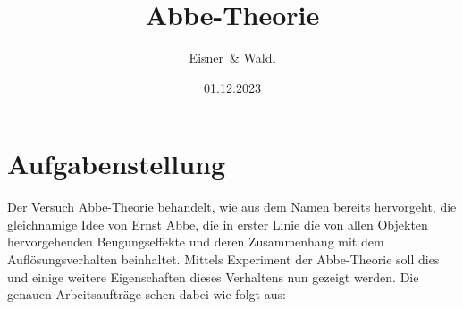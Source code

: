 \documentclass[12pt,a4paper,twoside]{article}
\begin{document}
\newcommand\laboratorynumber{2}
\title{Abbe-Theorie}
\newcommand\supervisor{Robert Nuster}
\newcommand\groupnumber{42}

\newcommand\participantonelastname{Eisner}
\newcommand\participantonefirstname{Nico}
\newcommand\participantoneid{12214121}
\newcommand\participanttwolastname{Waldl}
\newcommand\participanttwofirstname{Philip}
\newcommand\participanttwoid{12214120}
\author{\participantonelastname \ \& \participanttwolastname}

\newcommand\degreeid{UB 033 678}
\newcommand\semester{23WS}
\date{01.12.2023}

\newcommand\coursetitle{Laborübungen 2: \\ Elektrizität, Magnetismus, Optik}

%



\tableofcontents
\newpage

\section{Aufgabenstellung} %

Der Versuch Abbe-Theorie behandelt, wie aus dem Namen bereits hervorgeht, die gleichnamige Idee von Ernst Abbe, die in erster Linie die von allen Objekten hervorgehenden Beugungseffekte und deren Zusammenhang mit dem Auflösungsverhalten beinhaltet.
Mittels Experiment der Abbe-Theorie soll dies und einige weitere Eigenschaften dieses Verhaltens nun gezeigt werden.
Die genauen Arbeitsaufträge sehen dabei wie folgt aus:
\end{document}
